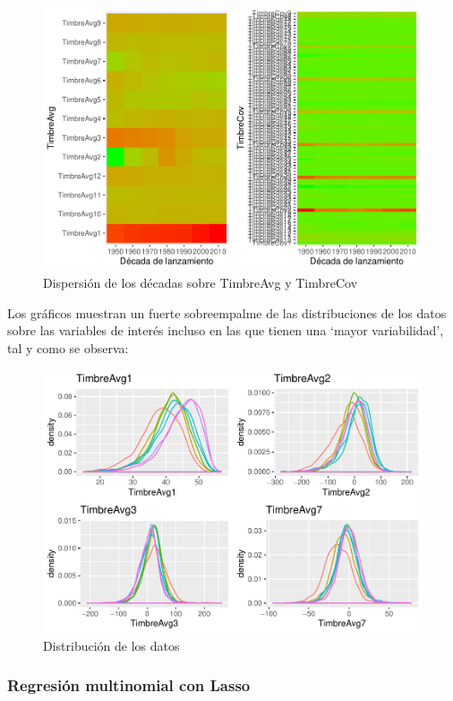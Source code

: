 \documentclass[conference,final,]{IEEEtran}
\begin{document}
\begin{figure}[ht]

{\centering \includegraphics[width=0.6\linewidth]{YearPrediction_Reporte_files/figure-latex/unnamed-chunk-12-1} 

}

\caption{Dispersión de los décadas sobre TimbreAvg y TimbreCov }\label{fig:unnamed-chunk-12}
\end{figure}

Los gráficos muestran un fuerte sobreempalme de las distribuciones de
los datos sobre las variables de interés incluso en las que tienen una
`mayor variabilidad', tal y como se observa:

\begin{figure}[ht]

{\centering \includegraphics[width=0.6\linewidth]{YearPrediction_Reporte_files/figure-latex/unnamed-chunk-13-1} 

}

\caption{Distribución de los datos}\label{fig:unnamed-chunk-13}
\end{figure}

\hypertarget{regresion-multinomial-con-lasso}{%
\subsubsection{Regresión multinomial con
Lasso}\label{regresion-multinomial-con-lasso}}
\end{document}
